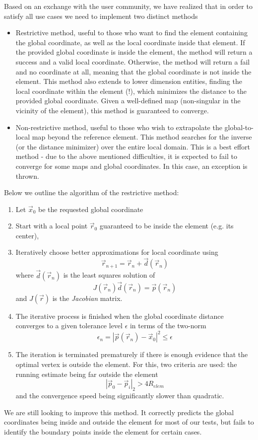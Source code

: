 \noindent
Based on an exchange with the \dune{} user community, we have realized that in order to satisfy all use cases we need to implement two distinct methods
\begin{itemize}
  \item Restrictive method, useful to those who want to find the element containing the global coordinate, as well as the local coordinate inside that element. If the provided global coordinate is inside the element, the method will return a success and a valid local coordinate. Otherwise, the method will return a fail and no coordinate at all, meaning that the global coordinate is not inside the element. This method also extends to lower dimension entities, finding the local coordinate within the element (!), which minimizes the distance to the provided global coordinate. Given a well-defined map (non-singular in the vicinity of the element), this method is guaranteed to converge.
  \item Non-restrictive method, useful to those who wish to extrapolate the global-to-local map beyond the reference element. This method searches for the inverse (or the distance minimizer) over the entire local domain. This is a best effort method - due to the above mentioned difficulties, it is expected to fail to converge for some maps and global coordinates. In this case, an exception is thrown.
\end{itemize}

\noindent
Below we outline the algorithm of the restrictive method:

\begin{mybox}
\begin{enumerate}
	\item Let $\vec{x}_0$ be the requested global coordinate
	\item Start with a local point $\vec{r}_0$ guaranteed to be inside the element (e.g. its center),
	\item Iteratively choose better approximations for local coordinate using \[\vec{r}_{n+1} = \vec{r}_n + \vec{d}(\vec{r}_n)\] where $\vec{d}(\vec{r}_n)$ is the least squares solution of
	        \[ J(\vec{r}_n) \vec{d}(\vec{r}_n) = \vec{p}(\vec{r}_n) \] and $J(\vec{r})$ is the \textit{Jacobian} matrix.
	\item The iterative process is finished when the global coordinate distance converges to a given tolerance level $\epsilon$ in terms of the two-norm
	        \[ \epsilon_n = |\vec{p}(\vec{r}_n) - \vec{x}_0 |^2 \leq \epsilon \]
	\item The iteration is terminated prematurely if there is enough evidence that the optimal vertex is outside the element. For this, two criteria are used: the running estimate being far outside the element \[|\vec{p}_0 - \vec{p}_i|_2 > 4 R_{elem}\] and the convergence speed being significantly slower than quadratic.
\end{enumerate}
\end{mybox}

\noindent
We are still looking to improve this method. It correctly predicts the global coordinates being inside and outside the element for most of our tests, but fails to identify the boundary points inside the element for certain cases.